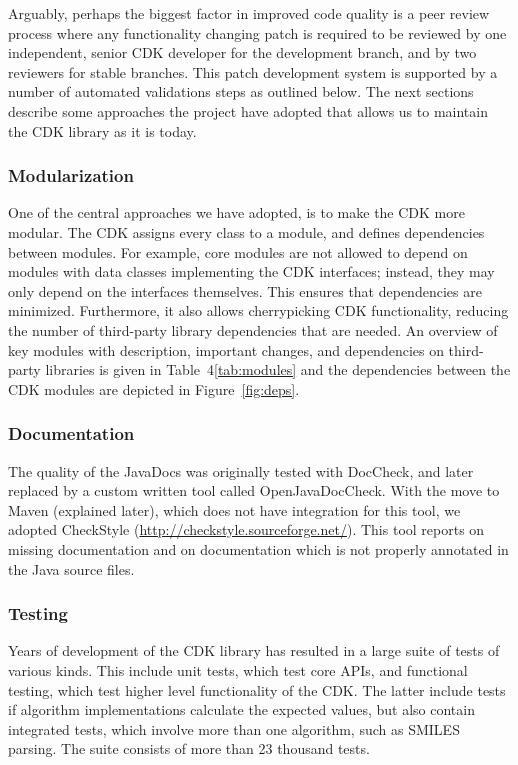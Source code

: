 \documentclass[10pt]{bmcart}
\begin{document}
Arguably, perhaps the biggest factor in improved code quality is a
peer review process where any functionality changing patch is required
to be reviewed by one independent, senior CDK developer for the
development branch, and by two reviewers for stable branches. This patch
development system is supported by a number of automated validations
steps as outlined below.
The next sections describe some approaches the project have adopted that allows
us to maintain the CDK library as it is today. 

\subsubsection*{Modularization}

One of the central approaches we have adopted, is to make the CDK more modular. The CDK assigns
every class to a module, and defines dependencies between modules. For example, core modules
are not allowed to depend on modules with data classes implementing the CDK interfaces;
instead, they may only depend on the interfaces themselves. This ensures that
dependencies are minimized. Furthermore, it also allows cherrypicking CDK
functionality, reducing the number of third-party library dependencies that are
needed.
An overview of key modules with description, important changes, and dependencies
on third-party libraries is given in Table~4\ref{tab:modules} and the dependencies
between the CDK modules are depicted in
Figure~\ref{fig:deps}.


\subsubsection*{Documentation}

The quality of the JavaDocs was originally tested with DocCheck, and
later replaced by a custom written tool called OpenJavaDocCheck. With the move
to Maven (explained later), which does not have integration for this tool,
we adopted CheckStyle (\url{http://checkstyle.sourceforge.net/}). This tool
reports on missing documentation and on documentation which is not properly
annotated in the Java source files.

\subsubsection*{Testing}

Years of development of the CDK library has resulted in a large suite of
tests of various kinds. This include unit tests, which test core APIs, and
functional testing, which test higher level functionality of the CDK. The
latter include tests if algorithm implementations calculate the expected
values, but also contain integrated tests, which involve more than one
algorithm, such as SMILES parsing. The suite consists of more than 23 thousand
tests.
\end{document}
